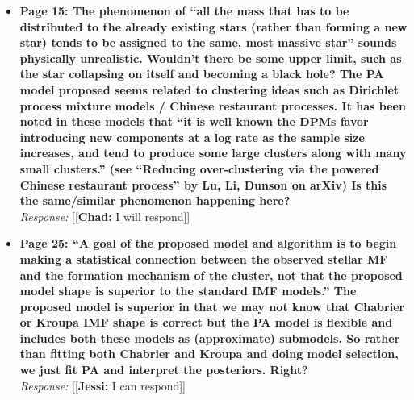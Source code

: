 \documentclass[11pt, oneside]{article}   	%
\newcommand{\jessi}[1]{{\color{blue}[[\textbf{Jessi: }#1]]}}
\newcommand{\chad}[1]{{\color{cyan}[[\textbf{Chad: }#1]]}}
\begin{document}
\begin{itemize}
\item {\bf Page 15: The phenomenon of ``all the mass that has to be distributed to the already existing stars (rather than forming a new star) tends to be assigned to the same, most massive star'' sounds physically unrealistic. Wouldn't there be some upper limit, such as the star collapsing on itself and becoming a black hole? The PA model proposed seems related to clustering ideas such as Dirichlet process mixture models / Chinese
restaurant processes. It has been noted in these models that ``it is well known the DPMs favor introducing new components at a log rate as the sample size increases, and tend to produce some large clusters along with many small clusters.'' (see ``Reducing over-clustering via the powered Chinese restaurant process'' by Lu, Li, Dunson on arXiv) Is this the same/similar phenomenon happening here?
} \\
\noindent \emph{Response:} \chad{I will respond}
\bigskip

\item {\bf Page 25: ``A goal of the proposed model and algorithm is to begin making a statistical connection between the observed stellar MF and the formation mechanism of the cluster, not that the proposed model shape is superior to the standard IMF models.'' The proposed model is superior in that we may not know that Chabrier or Kroupa IMF shape is correct but the PA model is flexible and includes both these models as (approximate) submodels. So rather than fitting both Chabrier and Kroupa and doing model selection, we just fit PA and interpret the posteriors. Right?} \\
\noindent \emph{Response:} \jessi{I can respond}
\bigskip
\end{itemize}


\\
\end{document}
